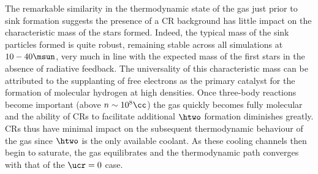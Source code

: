 The remarkable similarity in the thermodynamic state of the gas just prior to sink formation suggests the presence of a CR background has little impact on the characteristic mass of the stars formed.  
Indeed, the typical mass of the sink particles formed is quite robust, remaining stable across all simulations at $10-40\msun$, very much in line with the expected mass of the first stars in the absence of radiative feedback. 
The universality of this characteristic mass can be attributed to the supplanting of free electrons as the primary catalyst for the formation of molecular hydrogen at high densities.  
Once three-body reactions become important (above $n\sim10^8\cc$) the gas quickly becomes fully molecular and the ability of CRs to facilitate additional $\htwo$ formation diminishes greatly. 
CRs thus have minimal impact on the subsequent thermodynamic behaviour of the gas since $\htwo$ is the only available coolant. 
As these cooling channels then begin to saturate, the gas equilibrates and the thermodynamic path converges with that of the $\ucr=0$ case.




